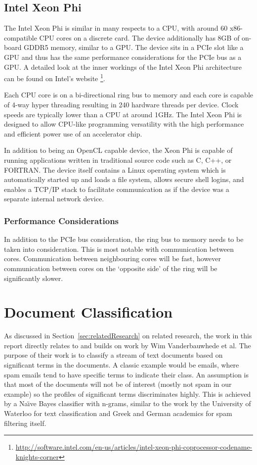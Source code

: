 \subsection{Intel Xeon Phi}

The Intel Xeon Phi is similar in many respects to a CPU, with around 60
x86-compatible CPU cores on a discrete card. The device additionally has 8GB of
on-board GDDR5 memory, similar to a GPU. The device sits in a PCIe slot like a
GPU and thus has the same performance considerations for the PCIe bus as a GPU.
A detailed look at the inner workings of the Intel Xeon Phi architecture can be
found on Intel's website
\footnote{\url{http://software.intel.com/en-us/articles/intel-xeon-phi-coprocessor-codename-knights-corner}}.

Each CPU core is on a bi-directional ring bus to memory and each core is capable
of 4-way hyper threading resulting in 240 hardware threads per device. Clock
speeds are typically lower than a CPU at around 1GHz. The Intel Xeon Phi is
designed to allow CPU-like programming versatility with the high performance and
efficient power use of an accelerator chip.

In addition to being an OpenCL capable device, the Xeon Phi is capable of
running applications written in traditional source code such as C, C++, or
FORTRAN. The device itself contains a Linux operating system which is
automatically started up and loads a file system, allows secure shell logins,
and enables a TCP/IP stack to facilitate communication as if the device was a
separate internal network device.

\subsubsection{Performance Considerations}

In addition to the PCIe bus consideration, the ring bus to memory needs to be
taken into consideration. This is most notable with communication between cores.
Communication between neighbouring cores will be fast, however communication
between cores on the `opposite side' of the ring will be significantly slower.

\section{Document Classification}

As discussed in Section~\ref{sec:relatedResearch} on related research, the work
in this report directly relates to and builds on work by Wim Vanderbauwhede et
al. The purpose of their work is to classify a stream of text documents based on
significant terms in the documents. A classic example would be emails, where
spam emails tend to have specific terms to indicate their class. An assumption
is that most of the documents will not be of interest (mostly not spam in our
example) so the profiles of significant terms discriminates highly. This is
achieved by a Na{\"{\i}}ve Bayes classifier with n-grams, similar to the work by
the University of Waterloo \cite{peng2003combining} for text classification and
Greek \cite{metsis2006spam} and German \cite{Schneider:2003:CEM:1067807.1067848}
academics for spam filtering itself.

